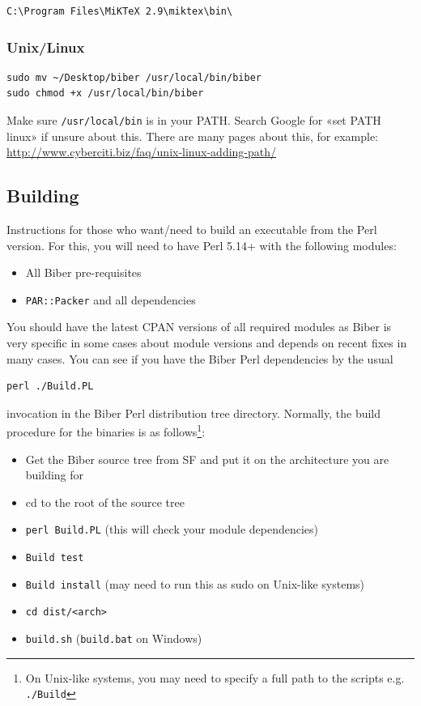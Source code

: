 \documentclass{ltxdockit}
\begin{document}
\begin{verbatim}
C:\Program Files\MiKTeX 2.9\miktex\bin\
\end{verbatim}

\subsubsection{Unix/Linux}

\begin{verbatim}
sudo mv ~/Desktop/biber /usr/local/bin/biber
sudo chmod +x /usr/local/bin/biber
\end{verbatim}

\noindent Make sure \verb+/usr/local/bin+ is in your PATH. Search Google for «set PATH
linux» if unsure about this. There are many pages about this, for example:
\url{http://www.cyberciti.biz/faq/unix-linux-adding-path/}


\subsection{Building}

Instructions for those who want/need to build an executable from the
Perl version. For this, you will need to have Perl 5.14+ with
the following modules:

\begin{itemize}
\item All Biber pre-requisites
\item \verb+PAR::Packer+ and all dependencies
\end{itemize}

\noindent You should have the latest CPAN versions of all required modules
as Biber is very specific in some cases about module versions and
depends on recent fixes in many cases. You can see if you have the
Biber Perl dependencies by the usual

\begin{verbatim}
perl ./Build.PL
\end{verbatim}

\noindent invocation in the Biber Perl distribution tree
directory. Normally, the build procedure for the binaries is as
follows\footnote{On Unix-like systems, you may need to specify a full
  path to the scripts e.g. \texttt{./Build}}:

\begin{itemize}
\item Get the Biber source tree from SF and put it on the architecture
  you are building for
\item cd to the root of the source tree
\item \verb+perl Build.PL+ (this will check your module
  dependencies)
\item \verb+Build test+
\item \verb+Build install+ (may need to run this as sudo on
  Unix-like systems)
\item \verb+cd dist/<arch>+
\item \verb+build.sh+ (\verb+build.bat+ on Windows)
\end{itemize}
\end{document}
